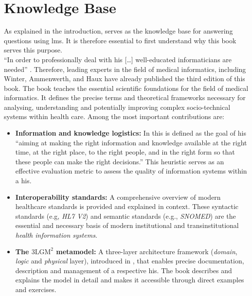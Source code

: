\section{Knowledge Base}\label{sec:knowledgeb}
As explained in the introduction, \citet{bb2} serves as the knowledge base for answering questions using \acp{lm}.
It is therefore essential to first understand why this book serves this purpose.\\
\enquote{In order to professionally deal with \ac{his} [\dots] well-educated informaticians are needed} \citep[p.e40]{Ammenwerth2017FvS}.
Therefore, leading experts in the field of medical informatics, including Winter, Ammenwerth, and Haux have already published the third edition of this book.
The book teaches the essential scientific foundations for the field of medical informatics. 
It defines the precise terms and theoretical frameworks necessary for analysing, understanding and potentially improving complex socio-technical systems within health care.
Among the most important contributions are:
\begin{itemize}
    \item \textbf{Information and knowledge logistics:}
    In \citet{bb2} this is defined as the goal of \ac{his} \enquote{aiming at making the right information and knowledge available at the right time, at the right place, to the right people, and in the right form so that these people can make the right decisions.} \citep[p.19]{bb2}
    This heuristic serves as an effective evaluation metric to assess the quality of information systems within a \ac{his}.
    \item \textbf{Interoperability standards:} A comprehensive overview of modern healthcare standards is provided and explained in context.
    These syntactic standards (e.g, \textit{HL7 V2}) and semantic standards (e.g., \textit{SNOMED}) are the essential and necessary basis of modern institutional and transinstitutional \textit{health information systems}.
    \item \textbf{The $\text{3LGM}^2$ metamodel:} A three-layer architecture framework (\textit{domain}, \textit{logic} and \textit{physical} layer), introduced in \citet{Winter2003threelgm2}, that enables precise documentation, description and management of a respective \ac{his}.
    The book describes and explains the model in detail and makes it accessible through direct examples and exercises.
\end{itemize}
